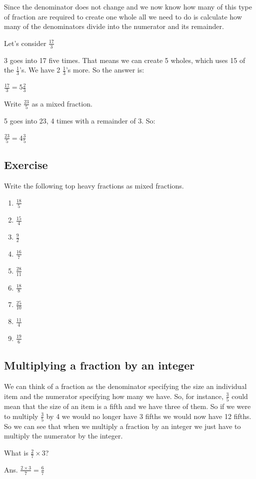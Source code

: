 \bigskip

Since the denominator does not change and we now know how many of this type of fraction are required to create one whole all we need to do is calculate how many of the denominators divide into the numerator and its remainder.

Let's consider $\displaystyle \frac{17}{3}$

\bigskip

3 goes into 17 five times.  That means we can create 5 wholes, which uses 15 of the $\frac{1}{3}$'s.  We have 2 $\frac{1}{3}$'s more. So the answer is: \bigskip

$\displaystyle \frac{17}{3} = 5 \frac{2}{3}$

\begin{exmp}
Write $\displaystyle \frac{23}{5}$ as a mixed fraction. \bigskip

5 goes into 23, 4 times with a remainder of 3. So: \bigskip

$\displaystyle \frac{23}{5} = 4 \frac{3}{5}$
\end{exmp}

\subsection{Exercise}
Write the following top heavy fractions as mixed fractions.
\begin{multicols}{3}
\begin{enumerate}
	\item $\displaystyle \frac{18}{5}$
	\item $\displaystyle \frac{15}{4}$
	\item $\displaystyle \frac{9}{2}$
	\item $\displaystyle \frac{16}{7}$
	\item $\displaystyle \frac{28}{11}$
	\item $\displaystyle \frac{18}{8}$
	\item $\displaystyle \frac{25}{10}$
	\item $\displaystyle \frac{11}{4}$
	\item $\displaystyle \frac{19}{6}$
\end{enumerate}
\end{multicols}

\subsection{Multiplying a fraction by an integer}
We can think of a fraction as the denominator specifying the size an individual item and the numerator specifying how many we have.  So, for instance, $\frac{3}{5}$ could mean that the size of an item is a fifth and we have three of them.
So if we were to multiply $\frac{3}{5}$ by 4 we would no longer have 3 fifths we would now have 12 fifths.
So we can see that when we multiply a fraction by an integer we just have to multiply the numerator by the integer.
\begin{exmp}
What is $\frac{2}{7} \times 3$?

Ans. $\frac{2 \times 3}{7} = \frac{6}{7}$
\end{exmp}


